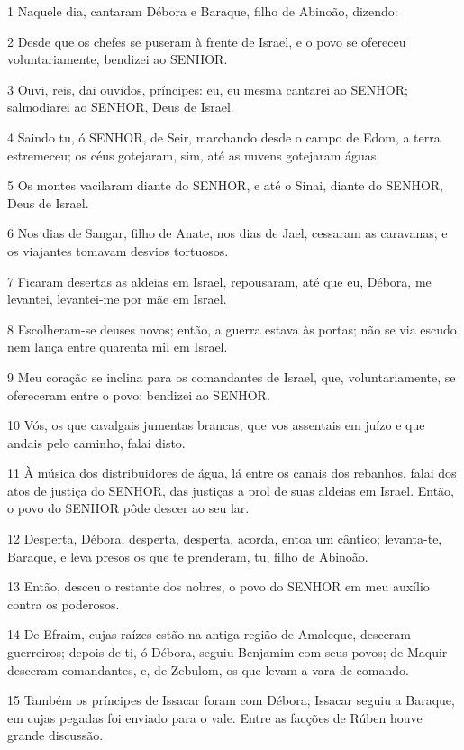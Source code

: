 \par 1 Naquele dia, cantaram Débora e Baraque, filho de Abinoão, dizendo:
\par 2 Desde que os chefes se puseram à frente de Israel, e o povo se ofereceu voluntariamente, bendizei ao SENHOR.
\par 3 Ouvi, reis, dai ouvidos, príncipes: eu, eu mesma cantarei ao SENHOR; salmodiarei ao SENHOR, Deus de Israel.
\par 4 Saindo tu, ó SENHOR, de Seir, marchando desde o campo de Edom, a terra estremeceu; os céus gotejaram, sim, até as nuvens gotejaram águas.
\par 5 Os montes vacilaram diante do SENHOR, e até o Sinai, diante do SENHOR, Deus de Israel.
\par 6 Nos dias de Sangar, filho de Anate, nos dias de Jael, cessaram as caravanas; e os viajantes tomavam desvios tortuosos.
\par 7 Ficaram desertas as aldeias em Israel, repousaram, até que eu, Débora, me levantei, levantei-me por mãe em Israel.
\par 8 Escolheram-se deuses novos; então, a guerra estava às portas; não se via escudo nem lança entre quarenta mil em Israel.
\par 9 Meu coração se inclina para os comandantes de Israel, que, voluntariamente, se ofereceram entre o povo; bendizei ao SENHOR.
\par 10 Vós, os que cavalgais jumentas brancas, que vos assentais em juízo e que andais pelo caminho, falai disto.
\par 11 À música dos distribuidores de água, lá entre os canais dos rebanhos, falai dos atos de justiça do SENHOR, das justiças a prol de suas aldeias em Israel. Então, o povo do SENHOR pôde descer ao seu lar.
\par 12 Desperta, Débora, desperta, desperta, acorda, entoa um cântico; levanta-te, Baraque, e leva presos os que te prenderam, tu, filho de Abinoão.
\par 13 Então, desceu o restante dos nobres, o povo do SENHOR em meu auxílio contra os poderosos.
\par 14 De Efraim, cujas raízes estão na antiga região de Amaleque, desceram guerreiros; depois de ti, ó Débora, seguiu Benjamim com seus povos; de Maquir desceram comandantes, e, de Zebulom, os que levam a vara de comando.
\par 15 Também os príncipes de Issacar foram com Débora; Issacar seguiu a Baraque, em cujas pegadas foi enviado para o vale. Entre as facções de Rúben houve grande discussão.
